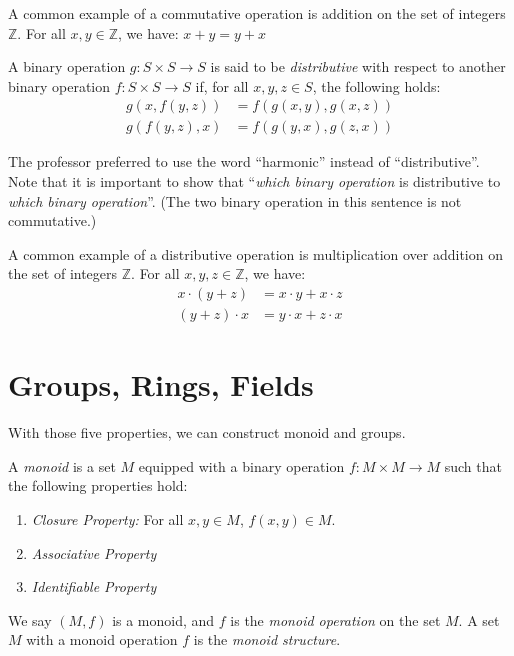 \documentclass[
	11pt, %
	fleqn, %
	a4paper, %
]{LegrandOrangeBook}
\begin{document}
\begin{example}
    A common example of a commutative operation is addition on the set of integers $\mathbb{Z}$. For all $x,y \in \mathbb{Z}$, we have: $x + y = y + x$
\end{example}

\begin{definition}
    A binary operation $g: S \times S \to S$ is said to be \emph{distributive} with respect to another binary operation $f: S \times S \to S$ if, for all $x,y,z \in S$, the following holds:
    \[ \begin{split}
        g(x,f(y,z)) &= f(g(x,y),g(x,z)) \\
        g(f(y,z),x) &= f(g(y,x),g(z,x))
    \end{split} \]
\end{definition}

The professor preferred to use the word ``harmonic'' instead of ``distributive''. Note that it is important to show that ``\emph{which binary operation} is distributive to \emph{which binary operation}''. (The two binary operation in this sentence is not commutative.)

\begin{example}
    A common example of a distributive operation is multiplication over addition on the set of integers $\mathbb{Z}$. For all $x,y,z \in \mathbb{Z}$, we have:
    \[ \begin{split}
        x \cdot (y + z) &= x \cdot y + x \cdot z \\
        (y + z) \cdot x &= y \cdot x + z \cdot x
    \end{split} \]
\end{example}

\newpage

\section{Groups, Rings, Fields}

With those five properties, we can construct monoid and groups.

\begin{definition}[Monoid]
    A \emph{monoid} is a set $M$ equipped with a binary operation $f: M \times M \to M$ such that the following properties hold:
    \begin{enumerate}
        \item \emph{Closure Property:} For all $x,y \in M$, $f(x,y) \in M$.
        \item \emph{Associative Property}
        \item \emph{Identifiable Property}
    \end{enumerate}
    We say $(M, f)$ is a monoid, and $f$ is the \emph{monoid operation} on the set $M$. A set $M$ with a monoid operation $f$ is the \emph{monoid structure}.
\end{definition}
\end{document}
